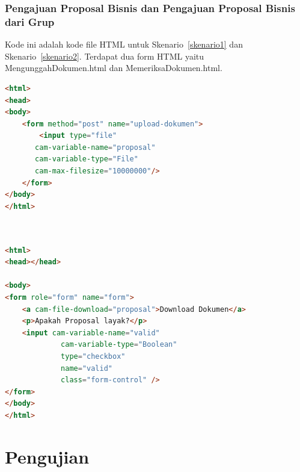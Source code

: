 \subsubsection{Pengajuan Proposal Bisnis dan Pengajuan Proposal Bisnis dari Grup}
Kode ini adalah kode file HTML untuk Skenario~\ref{skenario1} dan Skenario~\ref{skenario2}. Terdapat dua form HTML yaitu MengunggahDokumen.html dan MemeriksaDokumen.html. 
\begin{lstlisting}[language=html,basicstyle=\tiny,caption=MengunggahDokumen.html]
<html>
<head>
<body>
	<form method="post" name="upload-dokumen">
		<input type="file"
       cam-variable-name="proposal"
       cam-variable-type="File"
       cam-max-filesize="10000000"/>
	</form>
</body>
</html>

\end{lstlisting}

\begin{lstlisting}[language=html,basicstyle=\tiny,caption=MemeriksaDokumen.html]


<html>
<head></head>

<body>
<form role="form" name="form">
  	<a cam-file-download="proposal">Download Dokumen</a>
    <p>Apakah Proposal layak?</p>
    <input cam-variable-name="valid"
             cam-variable-type="Boolean"
             type="checkbox"
             name="valid"
             class="form-control" />  
</form> 
</body>
</html>

\end{lstlisting}

\section{Pengujian}
\label{sec:pengujian}

